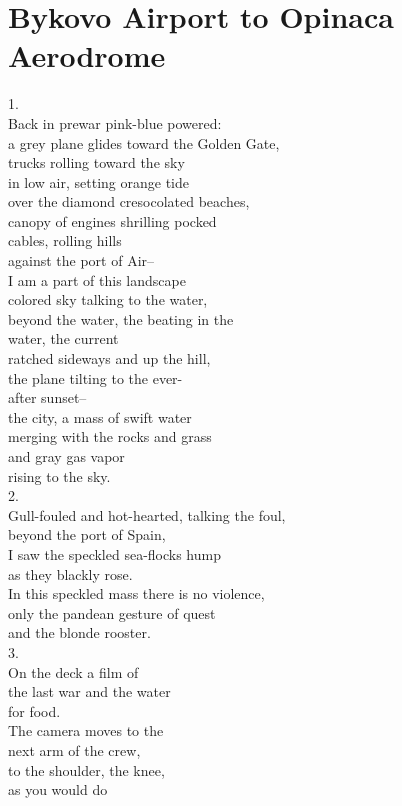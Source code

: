 \documentclass[smalldemyvopaper,11pt,twoside,onecolumn,openright,extrafontsizes]{memoir}
\begin{document}
\chapter{Bykovo Airport to Opinaca Aerodrome}
1.
\\Back in prewar pink-blue powered:
\\a grey plane glides toward the Golden Gate,
\\trucks rolling toward the sky
\\in low air, setting orange tide
\\over the diamond cresocolated beaches,
\\canopy of engines shrilling pocked
\\cables, rolling hills
\\against the port of Air--
\\I am a part of this landscape
\\colored sky talking to the water,
\\beyond the water, the beating in the
\\water, the current
\\ratched sideways and up the hill,
\\the plane tilting to the ever-
\\after sunset--
\\the city, a mass of swift water
\\merging with the rocks and grass
\\and gray gas vapor
\\rising to the sky.
\\2.
\\Gull-fouled and hot-hearted, talking the foul,
\\beyond the port of Spain,
\\I saw the speckled sea-flocks hump
\\as they blackly rose.
\\In this speckled mass there is no violence,
\\only the pandean gesture of quest
\\and the blonde rooster.
\\3.
\\On the deck a film of
\\the last war and the water
\\for food.
\\The camera moves to the
\\next arm of the crew,
\\to the shoulder, the knee,
\\as you would do
\end{document}

